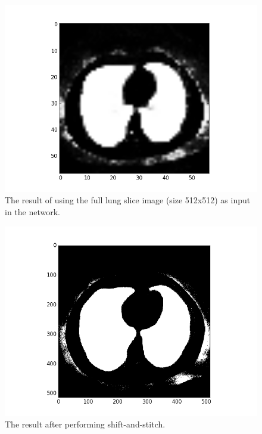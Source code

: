 \documentclass{article}
\begin{document}
\begin{figure}
    \centering
    \includegraphics[width=\linewidth]{best_wel_lon.png}
    \caption{The result of using the full lung slice image (size 512x512) as input in the network.}
    \label{bestwellon}
\end{figure}

\begin{figure}
    \centering
    \includegraphics[width=\linewidth]{best_wel_prima.png}
    \caption{The result after performing shift-and-stitch.}
    \label{bestwelprima}
\end{figure}
\end{document}
